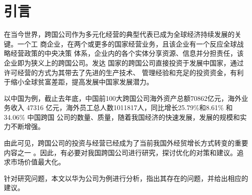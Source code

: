 \documentclass[../main]{subfiles}
\begin{document}
\chapter{引言}%
\label{cha:引言}

在当今世界，跨国公司作为多元化经营的典型代表已成为全球经济持续发展的关键。一个工
商企业，在两个或更多的国家经营业务，且该企业有一个反应全球战略经营政策的中央决策
体系，企业内的各个实体分享资源、信息并分担责任，该企业即为狭义上的跨国公司。发达
国家的跨国公司直接投资于发展中国家，通过许可经营的方式为其带去了先进的生产技术、
管理经验和充足的投资资金，有利于缩小全球贫富差距，提高发展中国家发展潜力。

以中国为例，截止去年底，中国前100大跨国公司海外资产总额70862亿元，海外业务收入
47316 亿元，海外员工总人数1011817人，同比增长25.79\%和8.61\% 和34.06\% 中国跨国
公司的数量、质量，随着我国经济的快速发展，发展的规模和实力不断增强。

由此可见，跨国公司的投资与经营已经成为了当前我国外经贸增长方式转变的重要内容之一
。因此，有必要对我国跨国公司进行研究，探讨优化的对策和建议。追求市场价值最大化。

针对研究问题，本文以华为公司为例进行分析，指出其存在的问题，并给出相应的建议。
\end{document}
